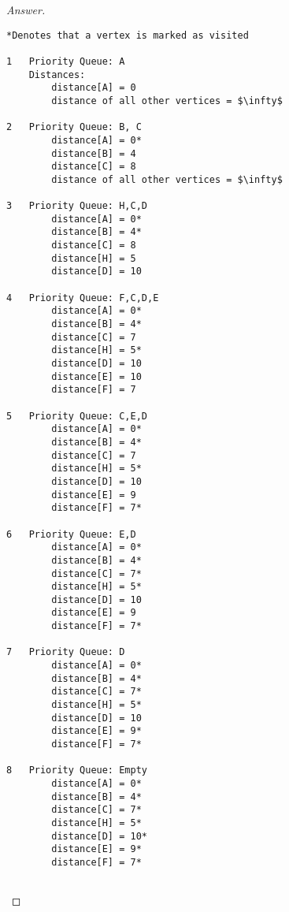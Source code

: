 \documentclass[11pt]{article}
\theoremstyle{definition}
\theoremstyle{definition}
\theoremstyle{definition}
\begin{document}
\begin{proof}[Answer] $ $
\begin{lstlisting}
*Denotes that a vertex is marked as visited

1   Priority Queue: A
    Distances: 
        distance[A] = 0 
        distance of all other vertices = $\infty$

2   Priority Queue: B, C
        distance[A] = 0* 
        distance[B] = 4
        distance[C] = 8
        distance of all other vertices = $\infty$

3   Priority Queue: H,C,D
        distance[A] = 0* 
        distance[B] = 4* 
        distance[C] = 8
        distance[H] = 5
        distance[D] = 10

4   Priority Queue: F,C,D,E  
        distance[A] = 0* 
        distance[B] = 4* 
        distance[C] = 7
        distance[H] = 5* 
        distance[D] = 10        
        distance[E] = 10
        distance[F] = 7 
        
5   Priority Queue: C,E,D
        distance[A] = 0* 
        distance[B] = 4* 
        distance[C] = 7
        distance[H] = 5* 
        distance[D] = 10        
        distance[E] = 9
        distance[F] = 7* 
        
6   Priority Queue: E,D
        distance[A] = 0* 
        distance[B] = 4* 
        distance[C] = 7* 
        distance[H] = 5* 
        distance[D] = 10        
        distance[E] = 9
        distance[F] = 7* 
        
7   Priority Queue: D
        distance[A] = 0* 
        distance[B] = 4* 
        distance[C] = 7* 
        distance[H] = 5* 
        distance[D] = 10        
        distance[E] = 9* 
        distance[F] = 7* 
        
8   Priority Queue: Empty
        distance[A] = 0* 
        distance[B] = 4* 
        distance[C] = 7* 
        distance[H] = 5* 
        distance[D] = 10*      
        distance[E] = 9* 
        distance[F] = 7* 
    
\end{lstlisting}
\end{proof}




\end{document}
